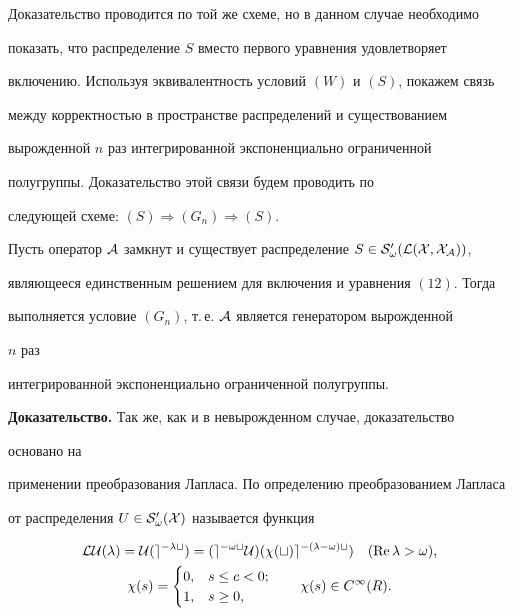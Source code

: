  


Доказательство проводится по той же схеме, но в данном случае необходимо 


показать, что распределение $S$ вместо первого уравнения удовлетворяет 


включению. Используя эквивалентность условий $(W)$ и $(S)$, покажем связь 


между корректностью в пространстве распределений и существованием 


вырожденной $n$ раз интегрированной экспоненциально ограниченной 


полугруппы. Доказательство этой связи будем проводить по 


следующей схеме: $(S)\Longrightarrow(G_n)\Longrightarrow(S)$. 


 


 


\begin{prop} 


Пусть оператор $\cal A$ замкнут и существует распределение $S\in\cal 


S'_\omega(\cal L(X,X_{\cal A}))$, 


являющееся единственным решением для включения и уравнения $(12)$. Тогда 


выполняется условие $(G_n)$, т.\,е. $\cal A$ является генератором вырожденной 


$n$ раз 


интегрированной экспоненциально ограниченной полугруппы. 


\end{prop} 


 


{\bf Доказательство.} Так же, как и в невырожденном случае, доказательство


основано на 


применении преобразования Лапласа. По определению преобразованием Лапласа 


от распределения $U\in\cal S'_\omega(X)$ называется функция 


\begin{gather*} 


\cal L U(\lambda)=U(e^{-\lambda t})=(e^{-\omega t}U) 


(\chi(t)e^{-(\lambda-\omega)t})\quad (\re\lambda>\omega),\\ 


% 


\chi(s)= 


\begin{cases} 


0, & s\le c<0;\\ 


1, & s\ge0, 


\end{cases} 


\qquad \chi(s)\in C^\infty(R). 


\end{gather*} 



